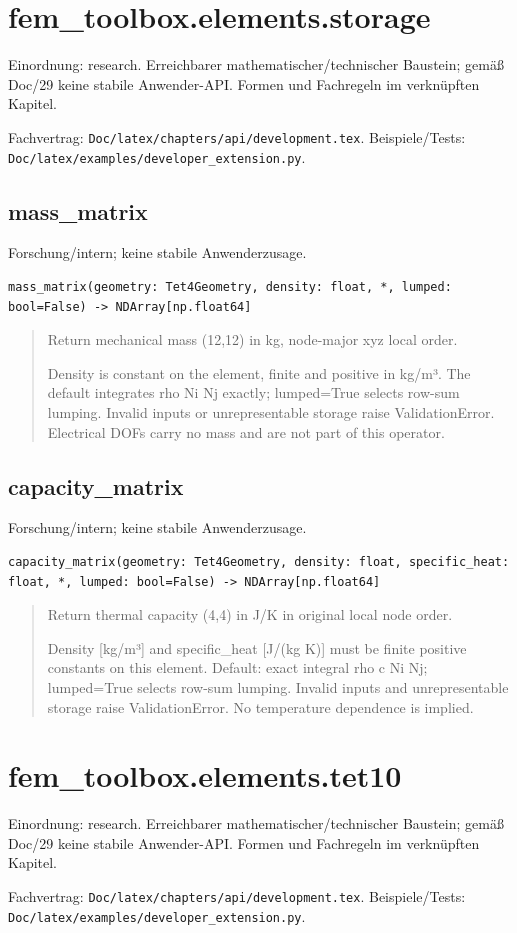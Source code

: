 \section{fem\_toolbox.elements.storage}
Einordnung: research. Erreichbarer mathematischer/technischer Baustein; gemäß Doc/29 keine stabile Anwender-API. Formen und Fachregeln im verknüpften Kapitel.
\par Fachvertrag: \nolinkurl{Doc/latex/chapters/api/development.tex}. Beispiele/Tests:
\nolinkurl{Doc/latex/examples/developer_extension.py}.
\subsection{mass\_matrix}
Forschung/intern; keine stabile Anwenderzusage.
\begin{lstlisting}
mass_matrix(geometry: Tet4Geometry, density: float, *, lumped: bool=False) -> NDArray[np.float64]
\end{lstlisting}
\begin{quote}
Return mechanical mass (12,12) in kg, node-major xyz local order.\par Density is constant on the element, finite and positive in kg/m³. The default integrates rho Ni Nj exactly; lumped=True selects row-sum lumping. Invalid inputs or unrepresentable storage raise ValidationError. Electrical DOFs carry no mass and are not part of this operator.
\end{quote}
\subsection{capacity\_matrix}
Forschung/intern; keine stabile Anwenderzusage.
\begin{lstlisting}
capacity_matrix(geometry: Tet4Geometry, density: float, specific_heat: float, *, lumped: bool=False) -> NDArray[np.float64]
\end{lstlisting}
\begin{quote}
Return thermal capacity (4,4) in J/K in original local node order.\par Density [kg/m³] and specific\_heat [J/(kg K)] must be finite positive constants on this element. Default: exact integral rho c Ni Nj; lumped=True selects row-sum lumping. Invalid inputs and unrepresentable storage raise ValidationError. No temperature dependence is implied.
\end{quote}
\section{fem\_toolbox.elements.tet10}
Einordnung: research. Erreichbarer mathematischer/technischer Baustein; gemäß Doc/29 keine stabile Anwender-API. Formen und Fachregeln im verknüpften Kapitel.
\par Fachvertrag: \nolinkurl{Doc/latex/chapters/api/development.tex}. Beispiele/Tests:
\nolinkurl{Doc/latex/examples/developer_extension.py}.
